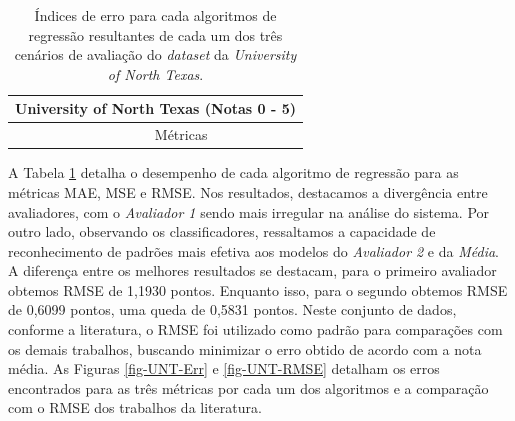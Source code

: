 \begin{table}[!h]
\begin{center}
\begin{tabular}{p{5cm} r r r }
    \hline
    \multicolumn{4}{l}{\textbf{University of North Texas} (Notas 0 - 5)} \\ \hline
     & \multicolumn{3}{c}{M{\'e}tricas} \\

    

    \hline
    \hline
\end{tabular}
\end{center}
\caption{Índices de erro para cada algoritmos de regressão resultantes de cada um dos três cenários de avaliação do \textit{dataset} da \textit{University of North Texas}.}
\label{tab-UNT75}
\end{table}

A Tabela \ref{tab-UNT75} detalha o desempenho de cada algoritmo de regressão para as métricas MAE, MSE e RMSE. Nos resultados, destacamos a divergência entre avaliadores, com o \textit{Avaliador 1} sendo mais irregular na análise do sistema. Por outro lado, observando os classificadores, ressaltamos a capacidade de reconhecimento de padrões mais efetiva aos modelos do \textit{Avaliador 2} e da \textit{Média}. A diferença entre os melhores resultados se destacam, para o primeiro avaliador obtemos RMSE de 1,1930 pontos. Enquanto isso, para o segundo obtemos RMSE de 0,6099 pontos, uma queda de 0,5831 pontos. Neste conjunto de dados, conforme a literatura, o RMSE foi utilizado como padrão para comparações com os demais trabalhos, buscando minimizar o erro obtido de acordo com a nota média. As Figuras \ref{fig-UNT-Err} e \ref{fig-UNT-RMSE} detalham os erros encontrados para as três métricas por cada um dos algoritmos e a comparação com o RMSE dos trabalhos da literatura.

